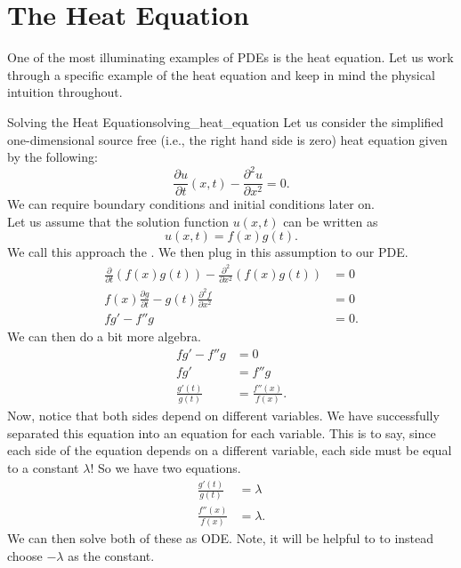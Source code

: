         \section{The Heat Equation}
        One of the most illuminating examples of PDEs is the heat equation.  Let us work through a specific example of the heat equation and keep in mind the physical intuition throughout.
        
        \begin{ex}{Solving the Heat Equation}{solving_heat_equation}
        Let us consider the simplified one-dimensional source free (i.e., the right hand side is zero) heat equation given by the following:
        \[
        \frac{\partial u}{\partial t}(x,t)-\frac{\partial^2 u}{\partial x^2} = 0.
        \]
        We can require boundary conditions and initial conditions later on.\\
        
        Let us assume that the solution function $u(x,t)$ can be written as
        \[
        u(x,t) = f(x)g(t).
        \]
        We call this approach the . We then plug in this assumption to our PDE.
        \begin{align*}
            \frac{\partial}{\partial t} (f(x)g(t))-\frac{\partial^2}{\partial x^2} (f(x)g(t)) &= 0\\
            f(x)\frac{\partial g}{\partial t}-g(t)\frac{\partial^2 f}{\partial x^2}&=0\\
            fg'-f''g &=0.
        \end{align*}
        We can then do a bit more algebra.
        \begin{align*}
            fg'-f''g&=0\\
            fg'&= f''g\\
            \frac{g'(t)}{g(t)}&=\frac{f''(x)}{f(x)}.
        \end{align*}
        Now, notice that both sides depend on different variables.  We have successfully separated this equation into an equation for each variable.  This is to say, since each side of the equation depends on a different variable, each side must be equal to a constant $\lambda$! So we have two equations.
        \begin{align*}
            \frac{g'(t)}{g(t)}&=\lambda\\
            \frac{f''(x)}{f(x)}&=\lambda.
        \end{align*}
        We can then solve both of these as ODE. Note, it will be helpful to to instead choose $-\lambda$ as the constant.
        \end{ex}
        
